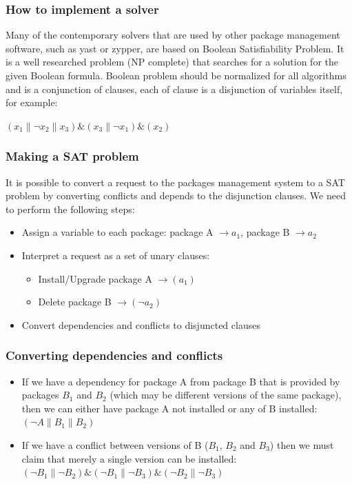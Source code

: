 \documentclass{beamer}
\begin{document}
\begin{frame}
\frametitle{How to implement a solver}

Many of the contemporary solvers that are used by other package management
software, such as yast or zypper, are based on Boolean Satisfiability
Problem. It is a well researched problem (NP complete) that searches for a
solution for the given Boolean formula. Boolean problem should be normalized for
all algorithms and is a conjunction of clauses, each of clause is a disjunction
of variables itself, for example:
\bigskip

$(x_1 \| \neg x_2 \| x_3) \& (x_3 \| \neg x_1) \& (x_2)$

\end{frame}

\begin{frame}
\frametitle{Making a SAT problem}
It is possible to convert a request to the packages management system to a SAT
problem by converting conflicts and depends to the disjunction clauses. We need
to perform the following steps:
\begin{itemize}
  \item Assign a variable to each package: 
  package A $\to a_1$, package B $\to a_2$
  \item Interpret a request as a set of unary clauses:
  \begin{itemize}
    \item Install/Upgrade package A $\to (a_1)$
    \item Delete package B $\to (\neg a_2)$
  \end{itemize}
  \item Convert dependencies and conflicts to disjuncted clauses
\end{itemize}

\end{frame}

\begin{frame}
\frametitle{Converting dependencies and conflicts}
\begin{itemize}
  \item If we have a dependency for package A from package B that is provided by
packages $B_1$ and $B_2$ (which may be different versions of the same package),
then we can either have package A not installed or any of B installed:
  \bigskip
$(\neg A \| B_1 \| B_2)$
  \item If we have a conflict between versions of B ($B_1$, $B_2$ and $B_3$)
 then we must claim that merely a single version can be installed:
  \bigskip
$(\neg B_1 \| \neg B_2) \& (\neg B_1 \| \neg B_3) \& (\neg B_2 \| \neg
B_3)$
\end{itemize}
\end{frame}
\end{document}
